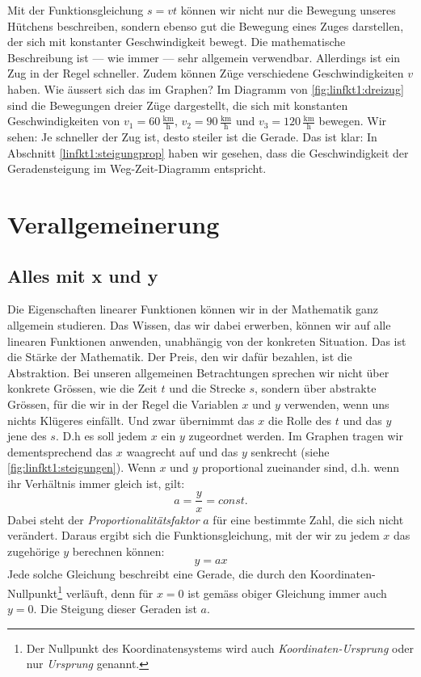 \documentclass[%
11pt,%
twoside,%
titlepage,%
german,%
headsepline%
]{scrartcl}
\newcommand{\ufrac}[2]{\ensuremath{\,\frac{\mathrm{#1}}{\mathrm{#2}}}}
\begin{document}
Mit der Funktionsgleichung $s=vt$ k\"onnen wir nicht nur die Bewegung unseres H\"utchens beschreiben, sondern ebenso gut die Bewegung eines Zuges darstellen, der sich mit konstanter Geschwindigkeit bewegt. Die mathematische Beschreibung ist --- wie immer --- sehr allgemein verwendbar. Allerdings ist ein Zug in der Regel schneller. Zudem k\"onnen Z\"uge verschiedene Geschwindigkeiten $v$ haben. Wie \"aussert sich das im Graphen? Im Diagramm von \ref{fig:linfkt1:dreizug} sind die Bewegungen dreier Z\"uge dargestellt, die sich mit konstanten Geschwindigkeiten von $v_1=60\ufrac{km}{h}$, $v_2=90\ufrac{km}{h}$ und $v_3=120\ufrac{km}{h}$ bewegen. Wir sehen: Je schneller der Zug ist, desto steiler ist die Gerade. Das ist klar: In Abschnitt \ref{linfkt1:steigungprop} haben wir gesehen, dass die Geschwindigkeit der Geradensteigung im Weg-Zeit-Diagramm entspricht.



\section{Verallgemeinerung}
\label{linfkt1:allg}

\subsection{Alles mit x und y}
\label{linfkt1:allg:xy}

Die Eigenschaften linearer Funktionen k\"onnen wir in der Mathematik ganz allgemein studieren. Das Wissen, das wir dabei erwerben, k\"onnen wir auf alle linearen Funktionen anwenden, unabh\"angig von der konkreten Situation. Das ist die St\"arke der Mathematik. Der Preis, den wir daf\"ur bezahlen, ist die Abstraktion. Bei unseren allgemeinen Betrachtungen sprechen wir nicht \"uber konkrete Gr\"ossen, wie die Zeit $t$ und die Strecke $s$, sondern \"uber abstrakte Gr\"ossen, f\"ur die wir in der Regel die Variablen $x$ und $y$ verwenden, wenn uns nichts Kl\"ugeres einf\"allt. Und zwar \"ubernimmt das $x$ die Rolle des $t$ und das $y$ jene des $s$. D.h es soll jedem $x$ ein $y$ zugeordnet werden. Im Graphen tragen wir dementsprechend das $x$ waagrecht auf und das $y$ senkrecht (siehe \ref{fig:linfkt1:steigungen}). Wenn $x$ und $y$ proportional zueinander sind, d.h. wenn ihr Verh\"altnis immer gleich ist, gilt:
\begin{displaymath}
  a = \frac{y}{x}=const.
\end{displaymath}
Dabei steht der \emph{Proportionalit\"atsfaktor} $a$ f\"ur eine bestimmte Zahl, die sich nicht ver\"andert. Daraus ergibt sich die Funktionsgleichung, mit der wir zu jedem $x$ das zugeh\"orige $y$ berechnen k\"onnen:
\begin{displaymath}
  y = ax
\end{displaymath}
Jede solche Gleichung beschreibt eine Gerade, die durch den Koordinaten-Nullpunkt\footnote{Der Nullpunkt des Koordinatensystems wird auch \emph{Koordinaten-Ursprung} oder nur \emph{Ursprung} genannt.} verl\"auft, denn f\"ur $x=0$ ist gem\"ass obiger Gleichung immer auch $y=0$. Die Steigung dieser Geraden ist $a$.
\end{document}
